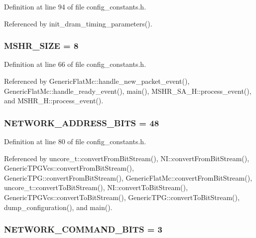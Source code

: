 Definition at line 94 of file config\_\-constants.h.

Referenced by init\_\-dram\_\-timing\_\-parameters().
\subsubsection[{MSHR\_\-SIZE}]{ {\bf MSHR\_\-SIZE} = 8}\label{config__constants_8h_4f1d8d474d4e841808eb38cf137c9d6e}




Definition at line 66 of file config\_\-constants.h.

Referenced by GenericFlatMc::handle\_\-new\_\-packet\_\-event(), GenericFlatMc::handle\_\-ready\_\-event(), main(), MSHR\_\-SA\_\-H::process\_\-event(), and MSHR\_\-H::process\_\-event().
\subsubsection[{NETWORK\_\-ADDRESS\_\-BITS}]{ {\bf NETWORK\_\-ADDRESS\_\-BITS} = 48}\label{config__constants_8h_bee72fa7d3b3eb5cc82e7dc8d6db8222}




Definition at line 80 of file config\_\-constants.h.

Referenced by uncore\_\-t::convertFromBitStream(), NI::convertFromBitStream(), GenericTPGVcs::convertFromBitStream(), GenericTPG::convertFromBitStream(), GenericFlatMc::convertFromBitStream(), uncore\_\-t::convertToBitStream(), NI::convertToBitStream(), GenericTPGVcs::convertToBitStream(), GenericTPG::convertToBitStream(), dump\_\-configuration(), and main().
\subsubsection[{NETWORK\_\-COMMAND\_\-BITS}]{ {\bf NETWORK\_\-COMMAND\_\-BITS} = 3}\label{config__constants_8h_dc7fe0dd54cfc2c2acf6e737e18116a1}





